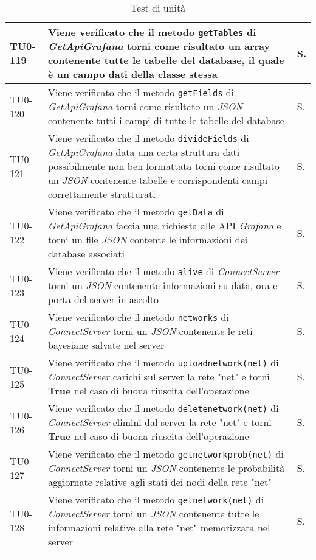 \begin{longtable}{|C{.15\textwidth}|m{.66\textwidth}|C{.10\textwidth}|}
\hline
TU0-119 & Viene verificato che il metodo \texttt{getTables} di \textit{GetApiGrafana} torni come risultato un array contenente tutte le tabelle del database, il quale è un campo dati della classe stessa & S.\\
\hline
{}TU0-120 & Viene verificato che il metodo \texttt{getFields} di \textit{GetApiGrafana} torni come risultato un \textit{JSON} contenente tutti i campi di tutte le tabelle del database & S.\\
\hline
TU0-121 & Viene verificato che il metodo \texttt{divideFields} di \textit{GetApiGrafana} data una certa struttura dati possibilmente non ben formattata torni come risultato un \textit{JSON} contenente tabelle e corrispondenti campi correttamente strutturati & S.\\
\hline
{}TU0-122 & Viene verificato che il metodo \texttt{getData} di \textit{GetApiGrafana} faccia una richiesta alle API \textit{Grafana} e torni un file \textit{JSON} contente le informazioni dei database associati & S.\\
\hline
TU0-123 & Viene verificato che il metodo \texttt{alive} di \textit{ConnectServer} torni un \textit{JSON} contenente informazioni su data, ora e porta del server in ascolto & S.\\
\hline
{}TU0-124 & Viene verificato che il metodo \texttt{networks} di \textit{ConnectServer} torni un \textit{JSON} contenente le reti bayesiane salvate nel server & S.\\
\hline
TU0-125 & Viene verificato che il metodo \texttt{uploadnetwork(net)} di \textit{ConnectServer} carichi sul server la rete "net" e torni \textbf{True} nel caso di buona riuscita dell'operazione & S.\\
\hline
{}TU0-126 & Viene verificato che il metodo \texttt{deletenetwork(net)} di \textit{ConnectServer} elimini dal server la rete "net" e torni \textbf{True} nel caso di buona riuscita dell'operazione & S.\\
\hline
TU0-127 & Viene verificato che il metodo \texttt{getnetworkprob(net)} di \textit{ConnectServer} torni un \textit{JSON} contenente le probabilità aggiornate relative agli stati dei nodi della rete "net" & S.\\
\hline
{}TU0-128 & Viene verificato che il metodo \texttt{getnetwork(net)} di \textit{ConnectServer} torni un \textit{JSON} contenente tutte le informazioni relative alla rete "net" memorizzata nel server & S.\\
\hline
\caption{Test di unità}
\label{testunita}
\end{longtable}



